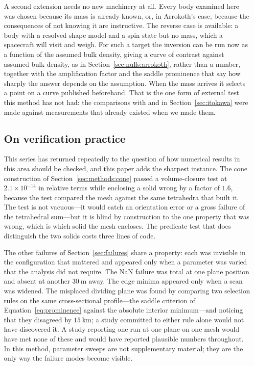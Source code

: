 A second extension needs no new machinery at all. Every body examined here
was chosen because its mass is already known, or, in Arrokoth's case,
because the consequences of not knowing it are instructive. The reverse case
is available: a body with a resolved shape model and a spin state but no
mass, which a spacecraft will visit and weigh. For such a target the
inversion can be run now as a function of the assumed bulk density, giving
a curve of contrast against assumed bulk density, as in
Section~\ref{sec:nulls:arrokoth}, rather than a number, together with
the amplification factor and the saddle prominence that say how sharply the
answer depends on the assumption. When the mass arrives it selects a point
on a curve published beforehand. That is the one form of external test this
method has not had: the comparisons with \citet{lowry2014} and
\citet{kanamaru2019} in Section~\ref{sec:itokawa} were made against
measurements that already existed when we made them.

\subsection{On verification practice}
\label{sec:discussion:verification}

This series has returned repeatedly to the question of how numerical results
in this area should be checked, and this paper adds the sharpest instance.
The cone construction of Section~\ref{sec:methods:cone} passed a
volume-closure test at $2.1\times10^{-14}$ in relative terms while enclosing
a solid wrong by a factor of $1.6$, because the test compared the mesh
against the same tetrahedra that built it. The test is not vacuous---it would
catch an orientation error or a gross failure of the tetrahedral sum---but it
is blind by construction to the one property that was wrong, which is which
solid the mesh encloses. The predicate test that does distinguish the two
solids costs three lines of code.

The other failures of Section~\ref{sec:failures} share a property: each was
invisible in the configuration that mattered and appeared only when a
parameter was varied that the analysis did not require. The NaN failure was
total at one plane position and absent at another $\SI{30}{\metre}$ away.
The edge minima appeared only when a scan was widened. The misplaced
dividing plane was found by comparing two selection rules on the same
cross-sectional profile---the saddle criterion of
Equation~\eqref{eq:prominence} against the absolute interior minimum---and
noticing that they disagreed by $\SI{15}{\kilo\metre}$; a study committed to
either rule alone would not have discovered it. A study reporting one run at
one plane on one mesh would have met none of these and would have reported
plausible numbers throughout. In this method, parameter sweeps are not
supplementary material; they are the only way the failure modes become
visible.

